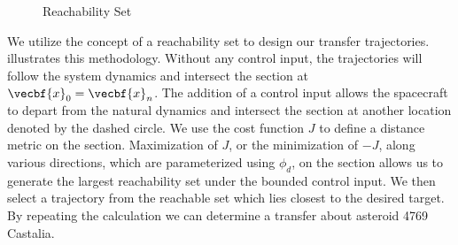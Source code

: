 \documentclass[11pt,reqno]{amsart} %
\begin{document}
\begin{multicols}{2}
\begin{figure}[H]
\begin{scaletikzpicturetowidth}{0.1\columnwidth}
\end{scaletikzpicturetowidth}
\caption{Reachability Set\label{fig:reachability_set}}
\end{figure}
We utilize the concept of a reachability set to design our transfer trajectories.
 illustrates this methodology.
Without any control input, the trajectories will follow the system dynamics and intersect the \Poincare section at \( \vecbf{x}_0 = \vecbf{x}_n\).
The addition of a control input allows the spacecraft to depart from the natural dynamics and intersect the section at another location denoted by the dashed circle.
We use the cost function \( J \) to define a distance metric on the \Poincare section.
Maximization of \( J \), or the minimization of \( -J \), along various directions, which are parameterized using \( \phi_d \), on the \Poincare section allows us to generate the largest reachability set under the bounded control input.
We then select a trajectory from the reachable set which lies closest to the desired target. 
By repeating the calculation we can determine a transfer about asteroid 4769 Castalia.


\end{multicols}
\end{document}
